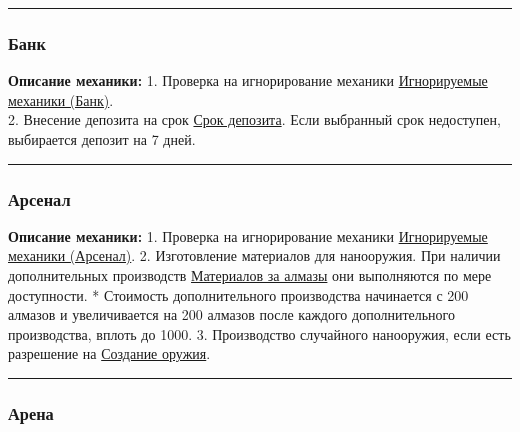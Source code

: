 \documentclass[
]{article}
\begin{document}
\begin{center}\rule{0.5\linewidth}{0.5pt}\end{center}

\subsubsection{Банк}\label{ux431ux430ux43dux43a}

\textbf{Описание механики:} 1. Проверка на игнорирование механики
\hyperref[ignor_states]{Игнорируемые механики (Банк)}.\\
2. Внесение депозита на срок \hyperref[bank_deposit_type]{Срок
депозита}. Если выбранный срок недоступен, выбирается депозит на 7 дней.

\begin{center}\rule{0.5\linewidth}{0.5pt}\end{center}

\subsubsection{Арсенал}\label{ux430ux440ux441ux435ux43dux430ux43b}

\textbf{Описание механики:} 1. Проверка на игнорирование механики
\hyperref[ignor_states]{Игнорируемые механики (Арсенал)}. 2.
Изготовление материалов для нанооружия. При наличии дополнительных
производств \hyperref[arsenal_material_speed_up]{Материалов за алмазы}
они выполняются по мере доступности. * Стоимость дополнительного
производства начинается с 200 алмазов и увеличивается на 200 алмазов
после каждого дополнительного производства, вплоть до 1000. 3.
Производство случайного нанооружия, если есть разрешение на
\hyperref[arsenal_make_mode]{Создание оружия}.

\begin{center}\rule{0.5\linewidth}{0.5pt}\end{center}

\subsubsection{Арена}\label{ux430ux440ux435ux43dux430}
\end{document}
